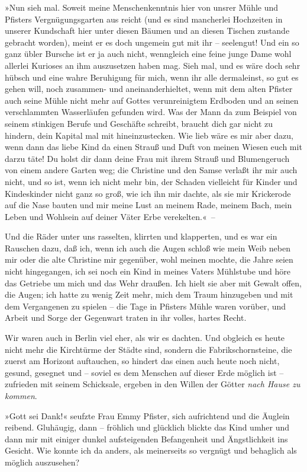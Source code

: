 »Nun sieh mal. Soweit meine Menschenkenntnis hier von unsrer Mühle
und Pfisters Vergnügungsgarten aus reicht (und es sind mancherlei
Hochzeiten in unserer Kundschaft hier unter diesen Bäumen und an
diesen Tischen zustande gebracht worden), meint er es doch ungemein
gut mit ihr – seelengut! Und ein so ganz übler Bursche ist er ja
auch nicht, wenngleich eine feine junge Dame wohl allerlei Kurioses
an ihm auszusetzen haben mag. Sieh mal, und es wäre doch sehr
hübsch und eine wahre Beruhigung für mich, wenn ihr alle
dermaleinst, so gut es gehen will, noch zusammen- und
aneinanderhieltet, wenn mit dem alten Pfister auch seine Mühle
nicht mehr auf Gottes verunreinigtem Erdboden und an seinen
verschlammten Wasserläufen gefunden wird. Was der Mann da zum
Beispiel von seinem stinkigen Berufe und Geschäfte schreibt,
braucht dich gar nicht zu hindern, dein Kapital mal mit
hineinzustecken. Wie lieb wäre es mir aber dazu, wenn dann das
liebe Kind da einen Strauß und Duft von meinen Wiesen euch mit
darzu täte! Du holst dir dann deine Frau mit ihrem Strauß und
Blumengeruch von einem andere Garten weg; die Christine und den
Samse verlaßt ihr mir auch nicht, und so ist, wenn ich nicht mehr
bin, der Schaden vielleicht für Kinder und Kindeskinder nicht ganz
so groß, wie ich ihn mir dachte, als sie mir Krickerode auf die
Nase bauten und mir meine Lust an meinem Rade, meinem Bach, mein
Leben und Wohlsein auf deiner Väter Erbe verekelten.«~–

Und die Räder unter uns rasselten, klirrten und klapperten, und es
war ein Rauschen dazu, daß ich, wenn ich auch die Augen schloß wie
mein Weib neben mir oder die alte Christine mir gegenüber, wohl
meinen mochte, die Jahre seien nicht hingegangen, ich sei noch ein
Kind in meines Vaters Mühlstube und höre das Getriebe um mich und
das Wehr draußen. Ich hielt sie aber mit Gewalt offen, die Augen;
ich hatte zu wenig Zeit mehr, mich dem Traum hinzugeben und mit dem
Vergangenen zu spielen – die Tage in Pfisters Mühle waren vorüber,
und Arbeit und Sorge der Gegenwart traten in ihr volles, hartes
Recht.

Wir waren auch in Berlin viel eher, als wir es dachten. Und
obgleich es heute nicht mehr die Kirchtürme der Städte sind,
sondern die Fabrikschornsteine, die zuerst am Horizont auftauchen,
so hindert das einen auch heute noch nicht, gesund, gesegnet und –
soviel es dem Menschen auf dieser Erde möglich ist – zufrieden mit
seinem Schicksale, ergeben in den Willen der Götter
\emph{nach Hause zu kommen}.

»Gott sei Dank!« seufzte Frau Emmy Pfister, sich aufrichtend und
die Äuglein reibend. Gluhäugig, dann – fröhlich und glücklich
blickte das Kind umher und dann mir mit einiger dunkel
aufsteigenden Befangenheit und Ängstlichkeit ins Gesicht. Wie
konnte ich da anders, als meinerseits so vergnügt und behaglich als
möglich auszusehen?

